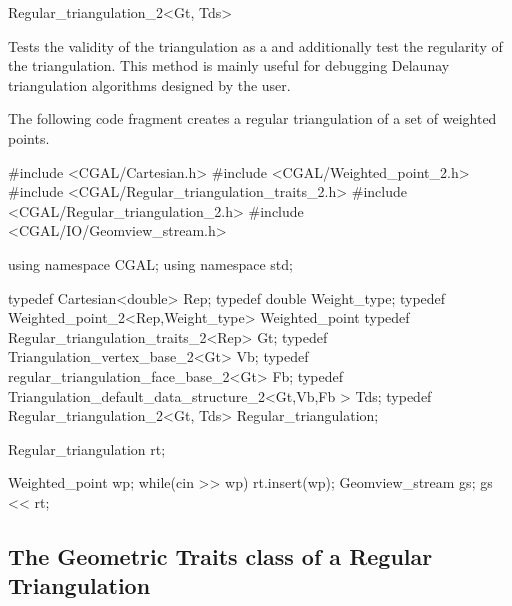 \begin{ccClassTemplate}{Regular_triangulation_2<Gt, Tds>}

\begin{ccAdvanced}
{ Tests the validity of the triangulation as a 
and additionally test the regularity of the triangulation. This method is
 mainly  useful for debugging Delaunay triangulation algorithms designed by
 the user.}
\end{ccAdvanced}
\end{ccClassTemplate}

\ccExample

The following code fragment creates a regular triangulation 
of a set of weighted points.


\begin{cprog}
#include <CGAL/Cartesian.h>
#include <CGAL/Weighted_point_2.h>
#include <CGAL/Regular_triangulation_traits_2.h>
#include <CGAL/Regular_triangulation_2.h>
#include <CGAL/IO/Geomview_stream.h>

using namespace CGAL;
using namespace std;

typedef Cartesian<double> Rep;
typedef double Weight_type;
typedef Weighted_point_2<Rep,Weight_type> Weighted_point
typedef Regular_triangulation_traits_2<Rep>  Gt;
typedef Triangulation_vertex_base_2<Gt> Vb;
typedef regular_triangulation_face_base_2<Gt> Fb;
typedef Triangulation_default_data_structure_2<Gt,Vb,Fb > Tds;
typedef Regular_triangulation_2<Gt, Tds> Regular_triangulation;

{
   Regular_triangulation rt;

    Weighted_point wp;
    while(cin >> wp){
        rt.insert(wp);
    }
    Geomview_stream gs;
    gs << rt;
}
\end{cprog} 


\subsection{The Geometric Traits class of a Regular Triangulation}

